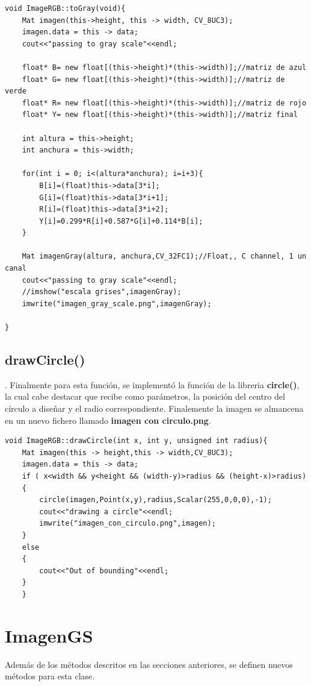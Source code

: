 \documentclass{article}
\begin{document}
\begin{verbatim}
void ImageRGB::toGray(void){
	Mat imagen(this->height, this -> width, CV_8UC3);
	imagen.data = this -> data;
	cout<<"passing to gray scale"<<endl;
	
	float* B= new float[(this->height)*(this->width)];//matriz de azul
	float* G= new float[(this->height)*(this->width)];//matriz de verde
	float* R= new float[(this->height)*(this->width)];//matriz de rojo
	float* Y= new float[(this->height)*(this->width)];//matriz final

	int altura = this->height;
	int anchura = this->width;

	for(int i = 0; i<(altura*anchura); i=i+3){
		B[i]=(float)this->data[3*i];
		G[i]=(float)this->data[3*i+1];
		R[i]=(float)this->data[3*i+2];
		Y[i]=0.299*R[i]+0.587*G[i]+0.114*B[i];
	}

	Mat imagenGray(altura, anchura,CV_32FC1);//Float,, C channel, 1 un canal
	cout<<"passing to gray scale"<<endl;
	//imshow("escala grises",imagenGray);
	imwrite("imagen_gray_scale.png",imagenGray);
	
}
\end{verbatim}

\subsection{drawCircle()}.
Finalmente para esta funci\' on, se implement\' o la funci\' on de la libreria \textbf{circle()}, la cual cabe destacar que recibe como par\' ametros, la posici\' on del centro del c\' irculo a dise\~ nar y el radio correspondiente.
Finalemente la imagen se almancena en un nuevo fichero llamado \textbf{imagen con circulo.png}.

\begin{verbatim}
void ImageRGB::drawCircle(int x, int y, unsigned int radius){
	Mat imagen(this -> height,this -> width,CV_8UC3);
	imagen.data = this -> data;
	if ( x<width && y<height && (width-y)>radius && (height-x)>radius)
	{
		circle(imagen,Point(x,y),radius,Scalar(255,0,0,0),-1);
		cout<<"drawing a circle"<<endl;
		imwrite("imagen_con_circulo.png",imagen);
	}
	else
	{
		cout<<"Out of bounding"<<endl;
	}
	}
\end{verbatim}

\section{ImagenGS}
Adem\' as de los m\' etodos descritos en las secciones anteriores, se definen nuevos m\' etodos para esta clase.
\end{document}
